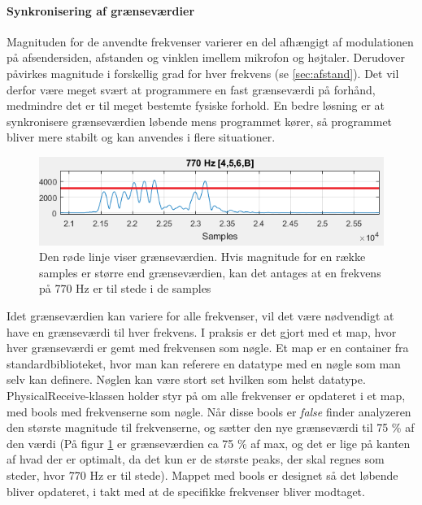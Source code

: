\paragraph{Synkronisering af grænseværdier}\hfill \break

Magnituden for de anvendte frekvenser varierer en del afhængigt af modulationen på afsendersiden, afstanden og vinklen imellem mikrofon og højtaler. Derudover påvirkes magnitude i forskellig grad for hver frekvens (se \ref{sec:afstand}). Det vil derfor være meget svært at programmere en fast grænseværdi på forhånd, medmindre det er til meget bestemte fysiske forhold. En bedre løsning er at synkronisere grænseværdien løbende mens programmet kører, så programmet bliver mere stabilt og kan anvendes i flere situationer.

\begin{figure}[h!]
\centering
\includegraphics[scale=0.7]{Billeder/Threshold.PNG}
\caption{Den røde linje viser grænseværdien. Hvis magnitude for en række samples er større end grænseværdien, kan det antages at en frekvens på 770 Hz er til stede i de samples}
\label{fig:threshold}
\end{figure}

Idet grænseværdien kan variere for alle frekvenser, vil det være nødvendigt at have en grænseværdi til hver frekvens. I praksis er det gjort med et map, hvor hver grænseværdi er gemt med frekvensen som nøgle. Et map er en container fra standardbiblioteket, hvor man kan referere en datatype med en nøgle som man selv kan definere. Nøglen kan være stort set hvilken som helst datatype. PhysicalReceive-klassen holder styr på om alle frekvenser er opdateret i et map, med bools med frekvenserne som nøgle. Når disse bools er \textit{false} finder analyzeren den største magnitude til frekvenserne, og sætter den nye grænseværdi til 75 \% af den værdi (På figur \ref{fig:threshold} er grænseværdien ca 75 \% af max, og det er lige på kanten af hvad der er optimalt, da det kun er de største peaks, der skal regnes som steder, hvor 770 Hz er til stede). Mappet med bools er designet så det løbende bliver opdateret, i takt med at de specifikke frekvenser bliver modtaget. 

